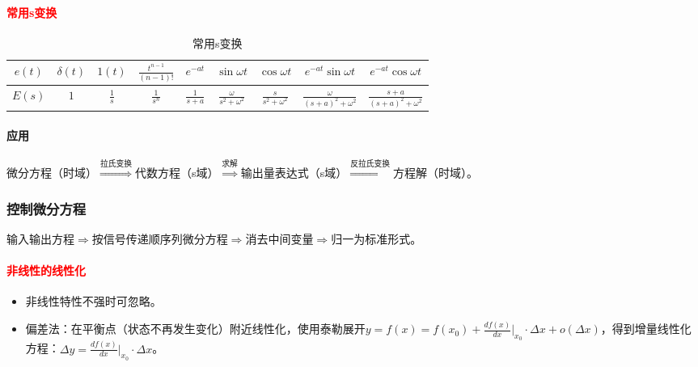 \documentclass[
12pt, %
a4paper, 
oneside, %
]{scrartcl}
\begin{document}
\paragraph{\textcolor{red}{常用s变换}}
\begin{table}[H]
\centering
\begin{tabular}{|c|c|c|c|c|c|c|c|c|}
\hline
$ e(t) $ & $ \delta(t) $ & $ 1(t) $ & $ \frac{t^{n - 1}}{(n - 1)!} $ & $ e^{-at} $ & $ \sin \omega t $ & $ \cos \omega t $ & $ e^{-at} \sin \omega t $ & $ e^{-at} \cos \omega t $ \\
\hline
$ E(s) $ & $ 1 $ & $ \frac{1}{s} $ & $ \frac{1}{s^n} $ & $ \frac{1}{s + a} $ & $ \frac{\omega}{s^2 + \omega^2} $ & $ \frac{s}{s^2 + \omega^2} $ & $ \frac{\omega}{(s + a)^2 + \omega^2} $ & $ \frac{s + a}{(s + a)^2 + \omega^2} $ \\
\hline
\end{tabular}
\caption{常用s变换}
\end{table}
\paragraph{应用}
微分方程（时域）$ \overset{\text{拉氏变换}}{\Longrightarrow} $代数方程（s域）$ \overset{\text{求解}}{\Longrightarrow} $输出量表达式（s域）$ \overset{\text{反拉氏变换}}{\Longrightarrow} $方程解（时域）。
\subsubsection[控制微分方程]{控制微分方程}
输入输出方程$ \Rightarrow $按信号传递顺序列微分方程$ \Rightarrow $消去中间变量$ \Rightarrow $归一为标准形式。
\paragraph{\textcolor{red}{非线性的线性化}}
\begin{itemize}
\item 非线性特性不强时可忽略。
\item 偏差法：在平衡点（状态不再发生变化）附近线性化，使用泰勒展开$ y = f(x) = f(x_0) + \frac{d f(x)}{dx}|_{x_0} \cdot \Delta x + o(\Delta x) $，得到增量线性化方程：$ \Delta y = \frac{d f(x)}{dx}|_{x_0} \cdot \Delta x $。
\end{itemize}
\end{document}

